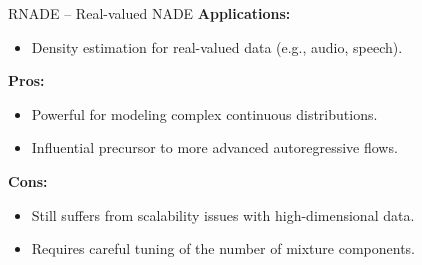 \begin{frame}[allowframebreaks]{RNADE – Real-valued NADE}
    \textbf{Applications:}
    \begin{itemize}
        \item Density estimation for real-valued data (e.g., audio, speech).
    \end{itemize}
    
    \framebreak
    \textbf{Pros:}
    \begin{itemize}
        \item Powerful for modeling complex continuous distributions.
        \item Influential precursor to more advanced autoregressive flows.
    \end{itemize}

    \textbf{Cons:}
    \begin{itemize}
        \item Still suffers from scalability issues with high-dimensional data.
        \item Requires careful tuning of the number of mixture components.
    \end{itemize}
\end{frame}